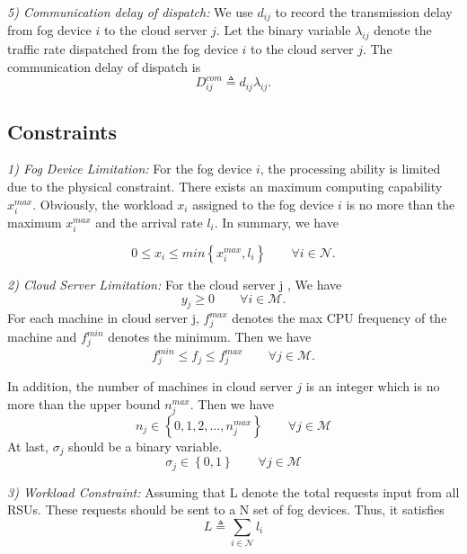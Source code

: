 \documentclass[twoside,twocolumn]{article}
\begin{document}
\textit{5) Communication delay of dispatch:} We use $d_{ij}$ to record the transmission delay from fog device $i$ to the cloud server $j$. Let the binary variable $\lambda_{ij}$ denote the traffic rate dispatched from the fog device $i$ to the cloud server $j$. The communication delay of dispatch is 
$$ D_{ij}^{com} \triangleq d_{ij}\lambda_{ij} .$$

\subsection{Constraints}

\textit{1) Fog Device Limitation:} For the fog device $i$, the processing ability is limited due to the physical constraint. There exists an maximum computing capability $x_i^{max}$. Obviously, the workload $x_i$ assigned to the fog device $i$ is no more than the maximum $x_i^{max}$ and the arrival rate $l_i$. In summary, we have

\begin{equation}
0 \leq x_i \leq min\left\{x_i^{max} , l_i\right\} \qquad \forall  i\in \mathcal{N}.
\end{equation}


\textit{2) Cloud Server Limitation:} For the cloud server j , We have 
\begin{equation}
y_j \geq 0 \qquad \forall i \in \mathcal{M}.
\end{equation}
For each machine in cloud server j, $f_j^{max}$ denotes the max CPU frequency of the machine and $f_j^{min}$ denotes the minimum. Then we have 
\begin{equation}
f_j^{min} \leq f_j \leq f_j^{max} \qquad \forall j \in \mathcal{M}.
\end{equation}

In addition, the number of machines in cloud server $j$ is an integer which is no more than the upper bound $n_j^{max}$. Then we have
\begin{equation}
n_j \in \left\{ 0,1,2,\dots,n_j^{max} \right\} \qquad \forall j \in \mathcal{M}
\end{equation}
At last, $\sigma_j$ should be a binary variable.
\begin{equation}
\sigma_j \in \left\{0,1\right\} \qquad \forall j \in \mathcal{M}
\end{equation}

\textit{3) Workload Constraint:} Assuming that L denote the total requests input from all RSUs. These requests should be sent to a N set of fog devices. Thus, it satisfies 
$$
L \triangleq \sum_{i \in \mathcal{N}} l_i
$$
\end{document}
